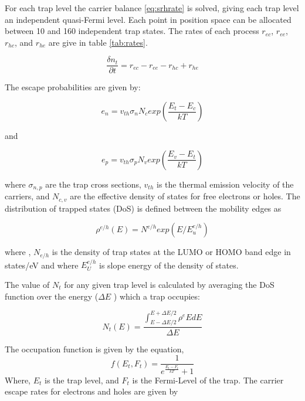 For each trap level the carrier balance \ref{eq:srhrate} is solved, giving each trap level an independent quasi-Fermi level. Each point in position space can be allocated between 10 and 160 independent trap states.  The rates of each process $r_{ec}$, $r_{ee}$, $r_{hc}$, and $r_{he}$ are give in table \ref{tab:rates}.

\begin{equation}
\label{eq:srhrate}
\frac{\delta n_t}{\partial t}=r_{ec}-r_{ee}-r_{hc}+r_{he}
\end{equation}

The escape probabilities are given by:

\begin{equation}
\label{eq:taile}
e_n=v_{th}\sigma_{n} N_{c} exp \left ( \frac{E_t-E_c}{kT}\right )
\end{equation}

and

\begin{equation}
\label{eq:taile}
e_p=v_{th}\sigma_{p} N_{v} exp \left ( \frac{E_v-E_t}{kT}\right )
\end{equation}

 where $\sigma_{n,p}$ are the trap cross sections, $v_{th}$ is the thermal emission velocity of the carriers, and $N_{c,v}$ are the effective density of states for free electrons or holes.  The distribution of trapped states (DoS) is defined between the mobility edges as

\begin{equation}
\label{eq:taile}
\rho^{e/h}(E)=N^{e/h}exp(E/E_{u}^{e/h})
\end{equation}

where , $N_{e/h}$ is the density of trap states at the LUMO or HOMO band edge
in states/eV and where $E_{U}^{e/h}$ is slope energy of the density of states. 

The value of $N_{t}$ for any given trap level is calculated by averaging the DoS function over the energy ($\Delta E$ ) which a trap occupies:

\begin{equation}
\label{eq:taile}
N_{t}(E)=\frac{\int^{E+\Delta E/2}_{E-\Delta E/2} \rho^{e}{E} dE}{\Delta E}
\end{equation}

The occupation function is given by the equation,
\begin{equation}
f(E_{t},F_{t})=\frac{1}{e^{\frac{E_{t}-F_{t}}{kT}}+1}
\end{equation}
Where, $E_{t}$ is the trap level, and $F_{t}$ is the Fermi-Level of the trap.
The carrier escape rates for electrons and holes are given by



